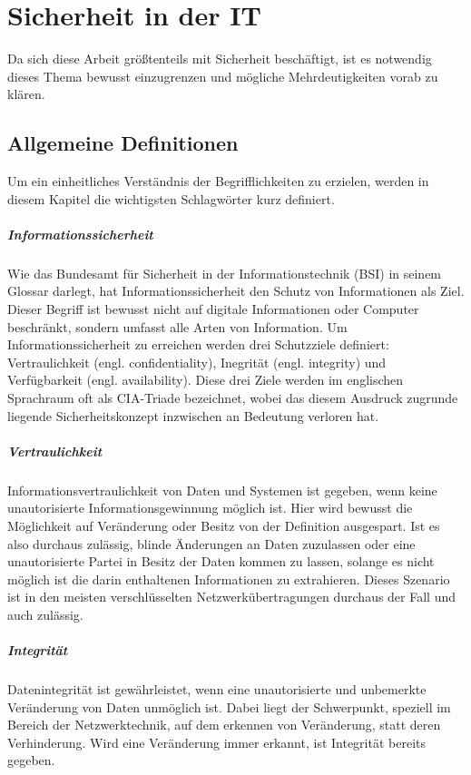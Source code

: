 \chapter{Sicherheit in der IT}
\label{chap:itsecurity}

Da sich diese Arbeit größtenteils mit Sicherheit beschäftigt, ist es notwendig dieses Thema bewusst einzugrenzen und mögliche Mehrdeutigkeiten vorab zu klären.

\section{Allgemeine Definitionen}
Um ein einheitliches Verständnis der Begrifflichkeiten zu erzielen, werden in diesem Kapitel die wichtigsten Schlagwörter kurz definiert.

\paragraph{Informationssicherheit}
Wie das Bundesamt für Sicherheit in der Informationstechnik (BSI) in seinem Glossar darlegt, hat Informationssicherheit den Schutz von Informationen als Ziel\cite{BSIGlossar}. Dieser Begriff ist bewusst nicht auf digitale Informationen oder Computer beschränkt, sondern umfasst alle Arten von Information. Um Informationssicherheit zu erreichen werden drei Schutzziele definiert: Vertraulichkeit (engl. confidentiality), Inegrität (engl. integrity) und Verfügbarkeit (engl. availability). Diese drei Ziele werden im englischen Sprachraum oft als CIA-Triade bezeichnet, wobei das diesem Ausdruck zugrunde liegende Sicherheitskonzept inzwischen an Bedeutung verloren hat\cite{Cherdantseva2013}.

\paragraph{Vertraulichkeit}
Informationsvertraulichkeit von Daten und Systemen ist gegeben, wenn keine unautorisierte Informationsgewinnung möglich ist\cite[p. 10]{Eckert2013}. Hier wird bewusst die Möglichkeit auf Veränderung oder Besitz von der Definition ausgespart. Ist es also durchaus zulässig, blinde Änderungen an Daten zuzulassen oder eine unautorisierte Partei in Besitz der Daten kommen zu lassen, solange es nicht möglich ist die darin enthaltenen Informationen zu extrahieren. Dieses Szenario ist in den meisten verschlüsselten Netzwerkübertragungen durchaus der Fall und auch zulässig.    

\paragraph{Integrität}
Datenintegrität ist gewährleistet, wenn eine unautorisierte und unbemerkte Veränderung von Daten unmöglich ist\cite[p. 9]{Eckert2013}. Dabei liegt der Schwerpunkt, speziell im Bereich der Netzwerktechnik, auf dem erkennen von Veränderung, statt deren Verhinderung. Wird eine Veränderung immer erkannt, ist Integrität bereits gegeben.

